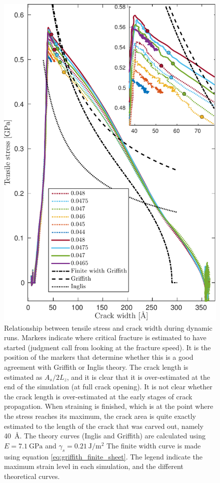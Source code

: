 \begin{figure}
\centering
\includegraphics[width=12cm]{../figures/thesis/stress_area_lefm.pdf}
\caption{Relationship between tensile stress and crack width during dynamic runs. Markers indicate where critical fracture is estimated to have started (judgment call from looking at the fracture speed). It is the position of the markers that determine whether this is a good agreement with Griffith or Inglis theory. The crack length is estimated as $A_s/2L_z$, and it is clear that it is over-estimated at the end of the simulation (at full crack opening). It is not clear whether the crack length is over-estimated at the early stages of crack propagation. When straining is finished, which is at the point where the stress reaches its maximum, the crack area is quite exactly estimated to the length of the crack that was carved out, namely \SI{40}{\angstrom}. The theory curves (Inglis and Griffith) are calculated using $E=\SI{7.1}{\giga\pascal}$ and $\gamma_s = \SI{0.21}{\joule\per\meter\squared}$ The finite width curve is made using equation \ref{eq:griffith_finite_sheet}. The legend indicate the maximum strain level in each simulation, and the different theoretical curves.}
\label{fig:fracture_theory_compare}
\end{figure}